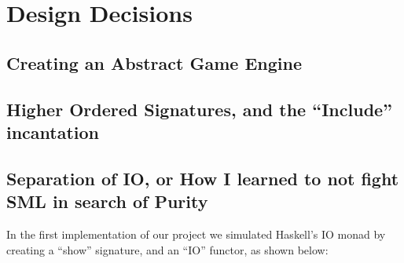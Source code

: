 \documentclass[9pt,letterpaper]{extarticle}
\begin{document}
	\section{Design Decisions}
  \subsection{Creating an Abstract Game Engine}
  \subsection{Higher Ordered Signatures, and the ``Include'' incantation}
  \subsection{Separation of IO, or How I learned to not fight SML in search of Purity}
  In the first implementation of our project we simulated Haskell's IO monad by
  creating a ``show'' signature, and an ``IO'' functor, as shown below:
\end{document}

